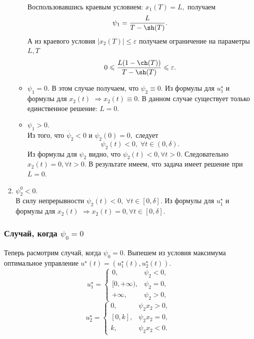 \documentclass[11pt]{article}
\begin{document}
\begin{enumerate}
\begin{itemize}
\begin{gather*}
   		\end{gather*}
   		Воспользовавшись краевым условием: $ x_1(T) = L, $ получаем
   		$$
   			\psi_1 = \frac{L}{T - \sh(T)}.
   		$$
   		А из краевого условия $ \vert x_2(T) \vert \leqslant \varepsilon $ получаем ограничение на параметры $ L, T $
   		$$
   			0 \leqslant \frac{L(1 - \ch(T))}{T - \sh(T)} \leqslant \varepsilon.
   		$$
   		\item $ \psi_1 = 0. $
   		В этом случае получаем, что $ \psi_2 \equiv 0. $ Из формулы для $ u_1^{\star} $ и формулы для $ x_2(t) $ $ \Rightarrow x_2(t) \equiv 0. $
   		В данном случае существует только единственное решение: $ L = 0. $
   		\item $ \psi_1 > 0. $ \\
   		Из того, что $ \dot{\psi_2} < 0 $ и $ \psi_2(0) = 0, $ следует
		$$
			\psi_2(t) < 0, \; \forall t \in (0, \delta).
		$$
		Из формулы для $ \psi_2 $ видно, что $ \psi_2(t) < 0, \forall t > 0. $
		Следовательно $ x_2(t) = 0, \forall t > 0. $ В результате имеем, что задача имеет решение при $ L = 0. $		 
   	\end{itemize}
   	\item $ \psi_2^0 < 0. $ \\
   	В силу непрерывности $ \psi_2(t) < 0, \; \forall t  \in [0, \delta]. $ Из формулы для $ u_1^{\star} $ и формулы для $ x_2(t) $ $ \Rightarrow x_2(t) = 0, \forall t \in [0, \delta]. $

	\end{enumerate}
	
	\subsubsection{Случай, когда $ \psi_0 = 0 $ }
	Теперь расмотрим случай, когда $ \psi_0 = 0. $
	Выпешем из условия максимума оптимальное управление $ u^{\star}(t) = (u_1^{\star}(t), u_2^{\star}(t)). $
	\begin{equation*}
		u_1^{\star} = 
		\begin{cases}
			0, & \psi_2 < 0, \\
			[0, +\infty), & \psi_2 = 0, \\ 
			+\infty, & \psi_2 > 0,
   		\end{cases}
   	\end{equation*}
   	\begin{equation*}
   		u_2^{\star} = 
		\begin{cases}
			0, & \psi_2 x_2 > 0, \\
			[0, k], & \psi_2 x_2 = 0, \\ 
			k, & \psi_2 x_2 < 0.
   		\end{cases}
	\end{equation*}	
\end{document}
